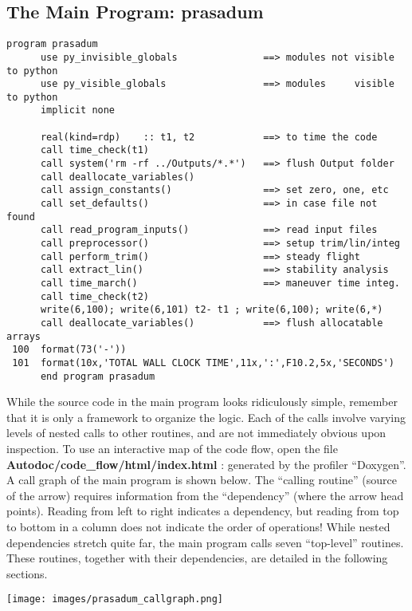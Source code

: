 \subsection{\textbf{The Main Program: prasadum}}
\begin{Verbatim}[baselinestretch=1.0]
      program prasadum
      use py_invisible_globals               ==> modules not visible to python
      use py_visible_globals                 ==> modules     visible to python
      implicit none      

      real(kind=rdp)    :: t1, t2            ==> to time the code
      call time_check(t1)
      call system('rm -rf ../Outputs/*.*')   ==> flush Output folder
      call deallocate_variables()
      call assign_constants()                ==> set zero, one, etc
      call set_defaults()                    ==> in case file not found
      call read_program_inputs()             ==> read input files
      call preprocessor()                    ==> setup trim/lin/integ
      call perform_trim()                    ==> steady flight
      call extract_lin()                     ==> stability analysis
      call time_march()                      ==> maneuver time integ.
      call time_check(t2)
      write(6,100); write(6,101) t2- t1 ; write(6,100); write(6,*)
      call deallocate_variables()            ==> flush allocatable arrays
 100  format(73('-'))
 101  format(10x,'TOTAL WALL CLOCK TIME',11x,':',F10.2,5x,'SECONDS')
      end program prasadum      
\end{Verbatim}
While the source code in the main program looks ridiculously simple, remember that it is only a framework to organize the logic. Each of the calls involve varying levels of nested calls to other routines, and are not immediately obvious upon inspection. To use an interactive map of the code flow, open the file \textbf{Autodoc/code\_flow/html/index.html} : generated by the profiler ``Doxygen''. A call graph of the main program is shown below. The ``calling routine'' (source of the arrow) requires information from the ``dependency'' (where the arrow head points). Reading from left to right indicates a dependency, but reading from top to bottom in a column does not indicate the order of operations! While nested dependencies stretch quite far, the main program calls seven ``top-level'' routines. These routines, together with their dependencies, are detailed in the following sections.
\begin{Figure}
 \centering
 \texttt{[image: images/prasadum\_callgraph.png]}
 \label{fig:mpcg}
\end{Figure}